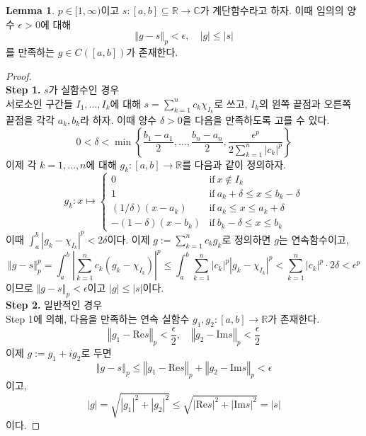 \documentclass[11pt]{book}
\numberwithin{equation}{chapter}
\def\RR{\mathbb{R}}
\def\CC{\mathbb{C}}
\def\eps{\epsilon}
\newcommand{\abs}[1]{\left\vert#1\right\vert}
\newcommand{\norm}[1]{\left\Vert#1\right\Vert}
\def\textif{\text{if}}
\theoremstyle{definition}
\newtheorem{lem}[thm]{Lemma}
\begin{document}
\begin{lem} \label{13.3.16}
    \(p \in [1, \infty)\)이고 \(s : [a, b] \subseteq \RR \to \CC\)가 계단함수라고 하자. 이때 임의의 양수 \(\eps > 0\)에 대해
    \[
    \norm{g - s}_p < \eps, \quad \abs{g} \le \abs{s}    
    \]
    를 만족하는 \(g \in C([a, b])\)가 존재한다.
\end{lem}
\begin{proof}
    \quad\\
    \textbf{Step 1.} \(s\)가 실함수인 경우\\
    서로소인 구간들 \(I_1, \ldots, I_k\)에 대해 \(s = \sum_{k=1}^n c_k \chi_{I_k}\)로 쓰고, \(I_k\)의 왼쪽 끝점과 오른쪽 끝점을 각각 \(a_k, b_k\)라 하자. 이때 양수 \(\delta > 0\)을 다음을 만족하도록 고를 수 있다.
    \[
    0 < \delta < \min \left\{\frac{b_1 - a_1}{2}, \ldots, \frac{b_n - a_n}{2}, \frac{\eps^p}{2 \sum_{k=1}^n \abs{c_k}^p }\right\}    
    \]
    이제 각 \(k = 1, \ldots, n\)에 대해 \(g_k : [a, b] \to \RR\)를 다음과 같이 정의하자.
    \[
    g_k : x \mapsto
    \begin{cases}
        0 &\textif \ x \notin I_k\\
        1 &\textif \ a_k + \delta \le x \le b_k - \delta\\
        (1/\delta)(x - a_k) &\textif \ a_k \le x \le a_k + \delta\\
        -(1-\delta)(x - b_k) &\textif \ b_k - \delta \le x \le b_k
    \end{cases}    
    \]
    이때 \(\int_a^b \abs{g_k - \chi_{I_k}}^p < 2\delta\)이다. 이제 \(g := \sum_{k=1}^n c_k g_k\)로 정의하면 \(g\)는 연속함수이고,
    \[
    \norm{g - s}_p^p = \int_a^b \abs{\sum_{k=1}^n c_k (g_k - \chi_{I_k})}^p \le \int_a^b \sum_{k=1}^n \abs{c_k}^p \abs{g_k - \chi_{I_k}}^p <  \sum_{k=1}^n \abs{c_k}^p \cdot 2\delta < \eps^p
    \]
    이므로 \(\norm{g - s}_p < \eps\)이고 \(\abs{g} \le \abs{s}\)이다.\\
    \textbf{Step 2.} 일반적인 경우\\
    Step 1에 의해, 다음을 만족하는 연속 실함수 \(g_1, g_2 : [a, b] \to \RR\)가 존재한다.
    \[
    \norm{g_1 - \mathrm{Re}s}_p < \frac{\eps}{2}, \quad  \norm{g_2 - \mathrm{Im}s}_p < \frac{\eps}{2}   
    \]
    이제 \(g := g_1 + ig_2\)로 두면
    \[
    \norm{g - s}_p \le \norm{g_1 - \mathrm{Re}s}_p +  \norm{g_2 - \mathrm{Im}s}_p < \eps
    \]
    이고,
    \[
    \abs{g} = \sqrt{\abs{g_1}^2 + \abs{g_2}^2} \le \sqrt{\abs{\mathrm{Re}s}^2 + \abs{\mathrm{Im}s}^2} = \abs{s}
    \]
    이다.
\end{proof}
\end{document}
